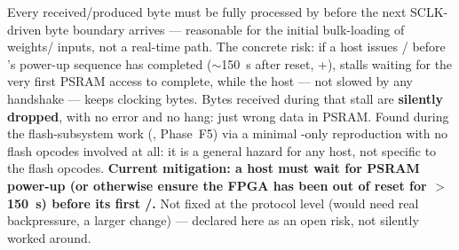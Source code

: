 \begin{fnwarn}
Every received/produced byte must be fully processed by  before the next
SCLK-driven byte boundary arrives --- reasonable for the initial bulk-loading of weights/
inputs, not a real-time path. The concrete risk: if a host issues /
 before 's power-up sequence has completed
($\sim$150~\textmu s after reset, +),
 stalls waiting for the very first PSRAM access to complete, while the
host --- not slowed by any handshake --- keeps clocking bytes. Bytes received during that
stall are \textbf{silently dropped}, with no error and no hang: just wrong data in PSRAM.
Found during the flash-subsystem work (, Phase~F5) via a minimal
-only reproduction with no flash opcodes involved at all: it is a general
hazard for any host, not specific to the flash opcodes. \textbf{Current mitigation: a host
must wait for PSRAM power-up (or otherwise ensure the FPGA has been out of reset for
$>$150~\textmu s) before its first /.} Not fixed at the
protocol level (would need real backpressure, a larger change) --- declared here as an open
risk, not silently worked around.
\end{fnwarn}
